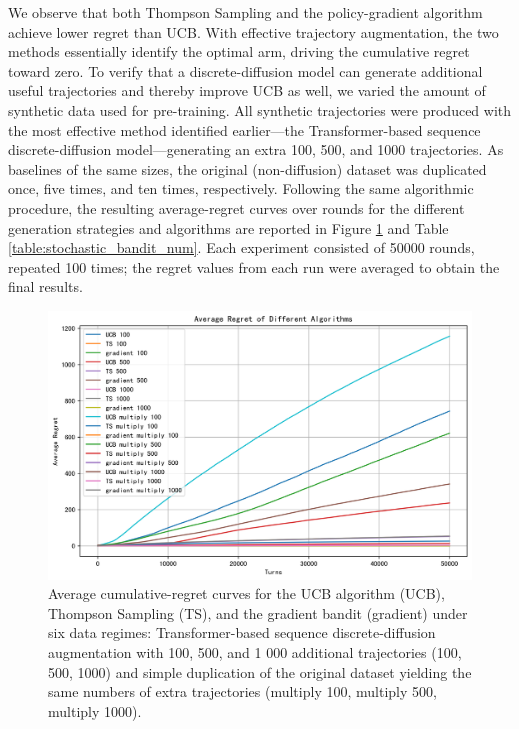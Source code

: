 We observe that both Thompson Sampling and the policy-gradient algorithm achieve lower regret than UCB. With effective trajectory augmentation, the two methods essentially identify the optimal arm, driving the cumulative regret toward zero. To verify that a discrete-diffusion model can generate additional useful trajectories and thereby improve UCB as well, we varied the amount of synthetic data used for pre-training. All synthetic trajectories were produced with the most effective method identified earlier—the Transformer-based sequence discrete-diffusion model—generating an extra 100, 500, and 1000 trajectories. As baselines of the same sizes, the original (non-diffusion) dataset was duplicated once, five times, and ten times, respectively. Following the same algorithmic procedure, the resulting average-regret curves over rounds for the different generation strategies and algorithms are reported in Figure \ref{fig:stochastic_bandit_num} and Table \ref{table:stochastic_bandit_num}. Each experiment consisted of 50000 rounds, repeated 100 times; the regret values from each run were averaged to obtain the final results.

\begin{figure}[htbp]
    \centering
    \includegraphics[width=\textwidth]{./Img/stochastic_bandit/time_comparison.png}
    \caption{Average cumulative-regret curves for the UCB algorithm (UCB), Thompson Sampling (TS), and the gradient bandit (gradient) under six data regimes: Transformer-based sequence discrete-diffusion augmentation with 100, 500, and 1 000 additional trajectories (100, 500, 1000) and simple duplication of the original dataset yielding the same numbers of extra trajectories (multiply 100, multiply 500, multiply 1000).}
    \label{fig:stochastic_bandit_num}
\end{figure}

